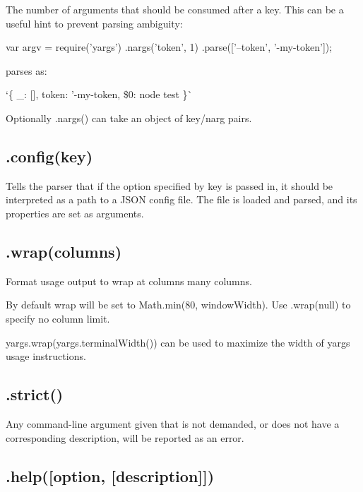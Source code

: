 The number of arguments that should be consumed after a key. This can be a useful hint to prevent parsing ambiguity\+:


\begin{DoxyCode}
var argv = require('yargs')
  .nargs('token', 1)
  .parse(['--token', '-my-token']);
\end{DoxyCode}


parses as\+:

`\{ \+\_\+\+: \mbox{[}\mbox{]}, token\+: '-\/my-\/token\textquotesingle{}, \textquotesingle{}\$0\textquotesingle{}\+: \textquotesingle{}node test\textquotesingle{} \}\`{}

Optionally {\ttfamily .nargs()} can take an object of {\ttfamily key}/{\ttfamily narg} pairs.

\subsection*{.config(key) }

Tells the parser that if the option specified by {\ttfamily key} is passed in, it should be interpreted as a path to a J\+S\+ON config file. The file is loaded and parsed, and its properties are set as arguments.

\subsection*{.wrap(columns) }

Format usage output to wrap at {\ttfamily columns} many columns.

By default wrap will be set to {\ttfamily Math.\+min(80, window\+Width)}. Use {\ttfamily .wrap(null)} to specify no column limit.

{\ttfamily yargs.\+wrap(yargs.\+terminal\+Width())} can be used to maximize the width of yargs\textquotesingle{} usage instructions.

\subsection*{.strict() }

Any command-\/line argument given that is not demanded, or does not have a corresponding description, will be reported as an error.

\subsection*{.help(\mbox{[}option, \mbox{[}description\mbox{]}\mbox{]}) }

